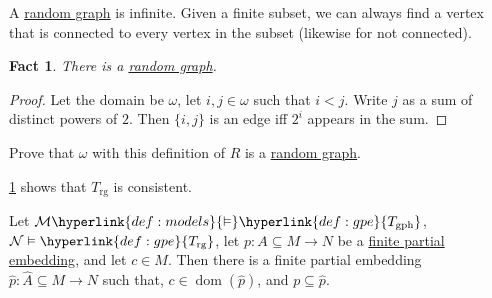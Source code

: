 \documentclass{article}
\let\models\vDash
\DeclareMathOperator{\dom}{dom}
\newtheorem{nfact}[nthm]{Fact}
\begin{document}
\begin{remark}
  A \hyperlink{def:rgraph}{random graph} is infinite.
  Given a finite subset, we can always find a vertex that is connected to every vertex in the subset (likewise for not connected).
\end{remark}
\begin{nfact}\label{fact:4.15}
  There is a \hyperlink{def:rgraph}{random graph}.
\end{nfact}
\begin{proof}
  Let the domain be $\omega$, let $i,j \in \omega$ such that $i < j$.
  Write $j$ as a sum of distinct powers of $2$.
  Then $\{i,j\}$ is an edge iff $2^i$ appears in the sum.
\end{proof}
\begin{exercise}
  Prove that $\omega$ with this definition of $R$ is a \hyperlink{def:rgraph}{random graph}.
\end{exercise}
\begin{remark}
\cref{fact:4.15} shows that $T_\text{rg}$ is consistent.
\end{remark}
\begin{nlemma}\label{lem:4.17}
  Let $\mathcal{M} \hyperlink{def:models}{\models} \hyperlink{def:gpe}{T_{\text{gph}}}$, $\mathcal{N} \models \hyperlink{def:gpe}{T_{\text{rg}}}$, let $p: A \subseteq M \to N$ be a \hyperlink{def:gpe}{finite partial embedding}, and let $c \in M$.
  Then there is a finite partial embedding $\hat{p}: \hat{A} \subseteq M \to N$ such that, $c \in \dom(\hat{p})$, and $p \subseteq \hat{p}$.
\end{nlemma}
\end{document}
